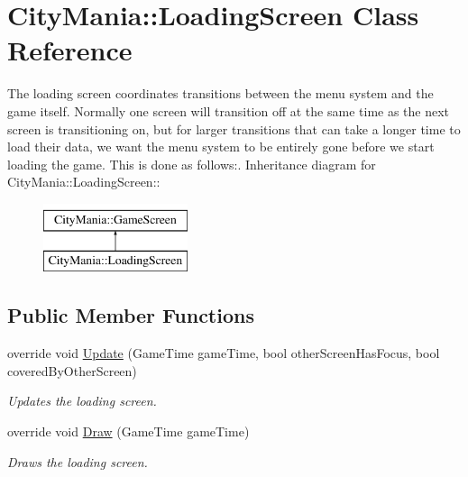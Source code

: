 \hypertarget{classCityMania_1_1LoadingScreen}{
\section{CityMania::LoadingScreen Class Reference}
\label{classCityMania_1_1LoadingScreen}
}


The loading screen coordinates transitions between the menu system and the game itself. Normally one screen will transition off at the same time as the next screen is transitioning on, but for larger transitions that can take a longer time to load their data, we want the menu system to be entirely gone before we start loading the game. This is done as follows:.  
Inheritance diagram for CityMania::LoadingScreen::\begin{figure}[H]
\begin{center}
\leavevmode
\includegraphics[height=2cm]{classCityMania_1_1LoadingScreen}
\end{center}
\end{figure}
\subsection*{Public Member Functions}
\begin{DoxyCompactItemize}
\item 
override void \hyperlink{classCityMania_1_1LoadingScreen_a587d8f5feaeb84a674f1102dfdb723d4}{Update} (GameTime gameTime, bool otherScreenHasFocus, bool coveredByOtherScreen)
\begin{DoxyCompactList}\small\item\em Updates the loading screen. \item\end{DoxyCompactList}\item 
override void \hyperlink{classCityMania_1_1LoadingScreen_ad5f650a3e0ce04391c97347a738dab2f}{Draw} (GameTime gameTime)
\begin{DoxyCompactList}\small\item\em Draws the loading screen. \item\end{DoxyCompactList}\end{DoxyCompactItemize}
